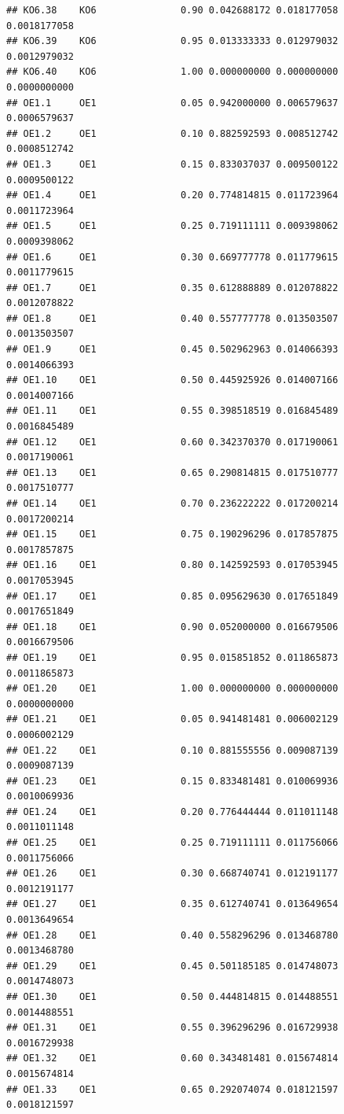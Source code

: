 \documentclass[
]{book}
\begin{document}
\begin{verbatim}
## KO6.38    KO6               0.90 0.042688172 0.018177058 0.0018177058
## KO6.39    KO6               0.95 0.013333333 0.012979032 0.0012979032
## KO6.40    KO6               1.00 0.000000000 0.000000000 0.0000000000
## OE1.1     OE1               0.05 0.942000000 0.006579637 0.0006579637
## OE1.2     OE1               0.10 0.882592593 0.008512742 0.0008512742
## OE1.3     OE1               0.15 0.833037037 0.009500122 0.0009500122
## OE1.4     OE1               0.20 0.774814815 0.011723964 0.0011723964
## OE1.5     OE1               0.25 0.719111111 0.009398062 0.0009398062
## OE1.6     OE1               0.30 0.669777778 0.011779615 0.0011779615
## OE1.7     OE1               0.35 0.612888889 0.012078822 0.0012078822
## OE1.8     OE1               0.40 0.557777778 0.013503507 0.0013503507
## OE1.9     OE1               0.45 0.502962963 0.014066393 0.0014066393
## OE1.10    OE1               0.50 0.445925926 0.014007166 0.0014007166
## OE1.11    OE1               0.55 0.398518519 0.016845489 0.0016845489
## OE1.12    OE1               0.60 0.342370370 0.017190061 0.0017190061
## OE1.13    OE1               0.65 0.290814815 0.017510777 0.0017510777
## OE1.14    OE1               0.70 0.236222222 0.017200214 0.0017200214
## OE1.15    OE1               0.75 0.190296296 0.017857875 0.0017857875
## OE1.16    OE1               0.80 0.142592593 0.017053945 0.0017053945
## OE1.17    OE1               0.85 0.095629630 0.017651849 0.0017651849
## OE1.18    OE1               0.90 0.052000000 0.016679506 0.0016679506
## OE1.19    OE1               0.95 0.015851852 0.011865873 0.0011865873
## OE1.20    OE1               1.00 0.000000000 0.000000000 0.0000000000
## OE1.21    OE1               0.05 0.941481481 0.006002129 0.0006002129
## OE1.22    OE1               0.10 0.881555556 0.009087139 0.0009087139
## OE1.23    OE1               0.15 0.833481481 0.010069936 0.0010069936
## OE1.24    OE1               0.20 0.776444444 0.011011148 0.0011011148
## OE1.25    OE1               0.25 0.719111111 0.011756066 0.0011756066
## OE1.26    OE1               0.30 0.668740741 0.012191177 0.0012191177
## OE1.27    OE1               0.35 0.612740741 0.013649654 0.0013649654
## OE1.28    OE1               0.40 0.558296296 0.013468780 0.0013468780
## OE1.29    OE1               0.45 0.501185185 0.014748073 0.0014748073
## OE1.30    OE1               0.50 0.444814815 0.014488551 0.0014488551
## OE1.31    OE1               0.55 0.396296296 0.016729938 0.0016729938
## OE1.32    OE1               0.60 0.343481481 0.015674814 0.0015674814
## OE1.33    OE1               0.65 0.292074074 0.018121597 0.0018121597

\end{verbatim}
\end{document}

